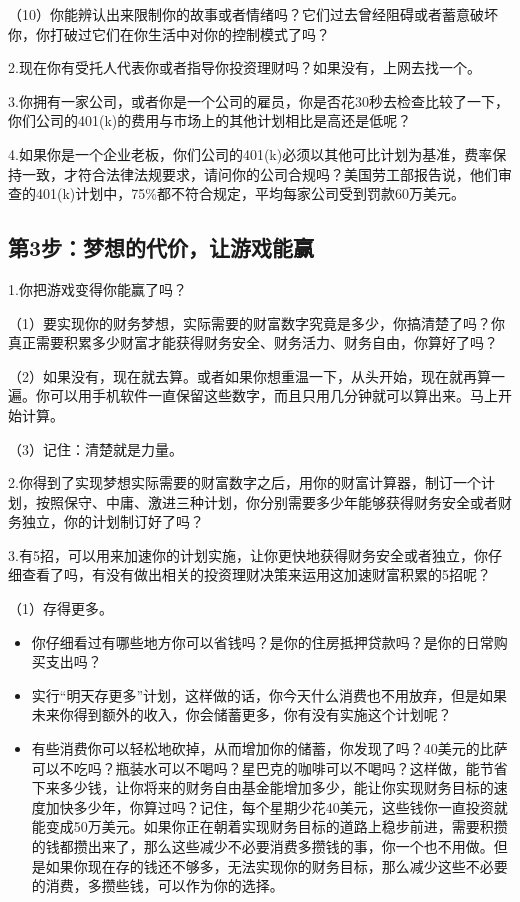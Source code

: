 （10）你能辨认出来限制你的故事或者情绪吗？它们过去曾经阻碍或者蓄意破坏你，你打破过它们在你生活中对你的控制模式了吗？

2.现在你有受托人代表你或者指导你投资理财吗？如果没有，上网去找一个。

3.你拥有一家公司，或者你是一个公司的雇员，你是否花30秒去检查比较了一下，你们公司的401(k)的费用与市场上的其他计划相比是高还是低呢？

4.如果你是一个企业老板，你们公司的401(k)必须以其他可比计划为基准，费率保持一致，才符合法律法规要求，请问你的公司合规吗？美国劳工部报告说，他们审查的401(k)计划中，75\%都不符合规定，平均每家公司受到罚款60万美元。

\subsection{第3步：梦想的代价，让游戏能赢}

1.你把游戏变得你能赢了吗？

（1）要实现你的财务梦想，实际需要的财富数字究竟是多少，你搞清楚了吗？你真正需要积累多少财富才能获得财务安全、财务活力、财务自由，你算好了吗？

（2）如果没有，现在就去算。或者如果你想重温一下，从头开始，现在就再算一遍。你可以用手机软件一直保留这些数字，而且只用几分钟就可以算出来。马上开始计算。

（3）记住：清楚就是力量。

2.你得到了实现梦想实际需要的财富数字之后，用你的财富计算器，制订一个计划，按照保守、中庸、激进三种计划，你分别需要多少年能够获得财务安全或者财务独立，你的计划制订好了吗？

3.有5招，可以用来加速你的计划实施，让你更快地获得财务安全或者独立，你仔细查看了吗，有没有做出相关的投资理财决策来运用这加速财富积累的5招呢？

（1）存得更多。

\begin{itemize}
\item 你仔细看过有哪些地方你可以省钱吗？是你的住房抵押贷款吗？是你的日常购买支出吗？
\item 实行“明天存更多”计划，这样做的话，你今天什么消费也不用放弃，但是如果未来你得到额外的收入，你会储蓄更多，你有没有实施这个计划呢？
\item 有些消费你可以轻松地砍掉，从而增加你的储蓄，你发现了吗？40美元的比萨可以不吃吗？瓶装水可以不喝吗？星巴克的咖啡可以不喝吗？这样做，能节省下来多少钱，让你将来的财务自由基金能增加多少，能让你实现财务目标的速度加快多少年，你算过吗？记住，每个星期少花40美元，这些钱你一直投资就能变成50万美元。如果你正在朝着实现财务目标的道路上稳步前进，需要积攒的钱都攒出来了，那么这些减少不必要消费多攒钱的事，你一个也不用做。但是如果你现在存的钱还不够多，无法实现你的财务目标，那么减少这些不必要的消费，多攒些钱，可以作为你的选择。
\end{itemize}


